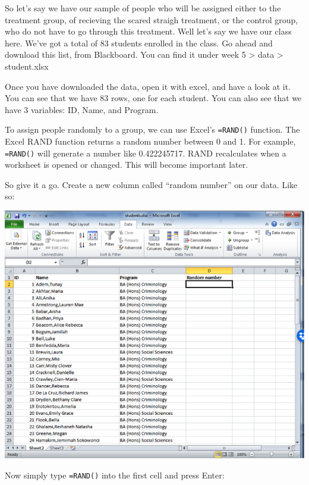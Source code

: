 \documentclass[]{book}
\theoremstyle{definition}
\theoremstyle{definition}
\theoremstyle{definition}
\theoremstyle{remark}
\begin{document}
 So let's say we have our sample of people who will be assigned either
to the treatment group, of recieving the scared straigh treatment, or
the control group, who do not have to go through this treatment. Well
let's say we have our class here. We've got a total of 83 students
enrolled in the class. Go ahead and download this list, from Blackboard.
You can find it under week 5 \textgreater{} data \textgreater{}
student.xlsx

Once you have downloaded the data, open it with excel, and have a look
at it. You can see that we have 83 rows, one for each student. You can
also see that we have 3 variables: ID, Name, and Program.

To assign people randomly to a group, we can use Excel's
\texttt{=RAND()} function. The Excel RAND function returns a random
number between 0 and 1. For example, \texttt{=RAND()} will generate a
number like 0.422245717. RAND recalculates when a worksheet is opened or
changed. This will become important later.

So give it a go. Create a new column called ``random number'' on our
data. Like so:

\includegraphics{imgs/rand_col.png}

Now simply type \texttt{=RAND()} into the first cell and press Enter:
\end{document}
